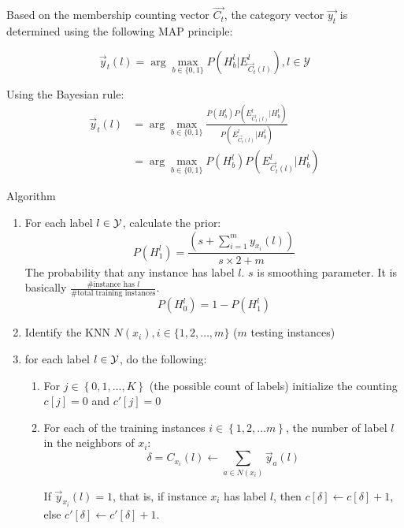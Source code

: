 Based on the membership counting vector $\vec{C_t}$, the category vector
$\vec{y_t}$ is determined using the following MAP principle:

\[ 
    \vec{y}_t(l) = \arg\max_{b\in \{0,1 \}} P(H_b^l|E_{\vec{C}_t(l)}^l), l
    \in \mathcal{Y}
\]

Using the Bayesian rule:
\begin{align*}
    \vec{y}_t(l) &= \arg\max_{b\in \{0, 1\}} \frac{P(H_b^l)
        P(E^l_{\vec{C}_t(l)}|H_b^l)}{P(E_{\vec{C}_t(l)}^l|H_b^l)} \\
        &= \arg\max_{b \in \{0, 1\}} P(H_b^l)P(E_{\vec{C}_t(l)}^l|H_b^l)
\end{align*}

Algorithm
\begin{enumerate}
    \item For each label $l \in \mathcal{Y}$, calculate the prior:
        \[P(H_1^l) = \frac{(s + \sum_{i=1}^m y_{x_i}(l))}{s \times 2 +
        m}\]
        The probability that any instance has label $l$. $s$ is smoothing
        parameter. It is basically $\frac{\#\mbox{instance has
        }l}{\#\mbox{total training instances}}$.
        \[ P(H_0^l) = 1 - P(H_1^l)\]
    \item Identify the KNN $N(x_i), i \in \{1, 2, \dots, m\}$ ($m$ testing
        instances)
    \item for each label $l \in \mathcal{Y}$, do the following:
        \begin{enumerate}
            \item For $j \in \left\{ 0, 1,
                \dots, K \right\}$ (the possible count of labels) initialize the counting $c[j] = 0$ and
                $c'[j] = 0$
            \item For each of the training instances $i \in \left\{ 1, 2,
                \dots m \right\}$, the number of label $l$ in the
                neighbors of $x_i$:
                \[ \delta = C_{x_i}(l) \leftarrow \sum_{a\in
                N(x_i)}\vec{y}_a(l)\]

                If $\vec{y}_{x_i}(l) =  1$, that is, if instance $x_i$
                has label $l$,  then $c[\delta] \leftarrow
                c[\delta] + 1$, else $c'[\delta] \leftarrow c'[\delta]
                + 1$.


\end{enumerate}
\end{enumerate}
